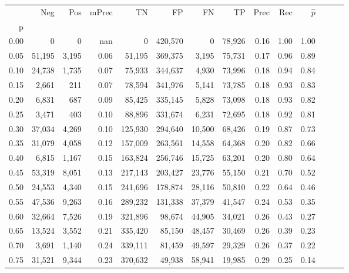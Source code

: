 \begin{tabular}{rrrrrrrrrrrrrr}
\toprule
{} &     Neg &    Pos & mPrec &       TN &       FP &      FN &      TP &  Prec &   Rec & $\hat{p}$ \\
p    &         &        &       &          &          &         &         &       &       &           \\
\midrule
0.00 &       0 &      0 &   nan &        0 &  420,570 &       0 &  78,926 &  0.16 &  1.00 &      1.00 \\
0.05 &  51,195 &  3,195 &  0.06 &   51,195 &  369,375 &   3,195 &  75,731 &  0.17 &  0.96 &      0.89 \\
0.10 &  24,738 &  1,735 &  0.07 &   75,933 &  344,637 &   4,930 &  73,996 &  0.18 &  0.94 &      0.84 \\
0.15 &   2,661 &    211 &  0.07 &   78,594 &  341,976 &   5,141 &  73,785 &  0.18 &  0.93 &      0.83 \\
0.20 &   6,831 &    687 &  0.09 &   85,425 &  335,145 &   5,828 &  73,098 &  0.18 &  0.93 &      0.82 \\
0.25 &   3,471 &    403 &  0.10 &   88,896 &  331,674 &   6,231 &  72,695 &  0.18 &  0.92 &      0.81 \\
0.30 &  37,034 &  4,269 &  0.10 &  125,930 &  294,640 &  10,500 &  68,426 &  0.19 &  0.87 &      0.73 \\
0.35 &  31,079 &  4,058 &  0.12 &  157,009 &  263,561 &  14,558 &  64,368 &  0.20 &  0.82 &      0.66 \\
0.40 &   6,815 &  1,167 &  0.15 &  163,824 &  256,746 &  15,725 &  63,201 &  0.20 &  0.80 &      0.64 \\
0.45 &  53,319 &  8,051 &  0.13 &  217,143 &  203,427 &  23,776 &  55,150 &  0.21 &  0.70 &      0.52 \\
0.50 &  24,553 &  4,340 &  0.15 &  241,696 &  178,874 &  28,116 &  50,810 &  0.22 &  0.64 &      0.46 \\
0.55 &  47,536 &  9,263 &  0.16 &  289,232 &  131,338 &  37,379 &  41,547 &  0.24 &  0.53 &      0.35 \\
0.60 &  32,664 &  7,526 &  0.19 &  321,896 &   98,674 &  44,905 &  34,021 &  0.26 &  0.43 &      0.27 \\
0.65 &  13,524 &  3,552 &  0.21 &  335,420 &   85,150 &  48,457 &  30,469 &  0.26 &  0.39 &      0.23 \\
0.70 &   3,691 &  1,140 &  0.24 &  339,111 &   81,459 &  49,597 &  29,329 &  0.26 &  0.37 &      0.22 \\
0.75 &  31,521 &  9,344 &  0.23 &  370,632 &   49,938 &  58,941 &  19,985 &  0.29 &  0.25 &      0.14 \\

\end{tabular}
